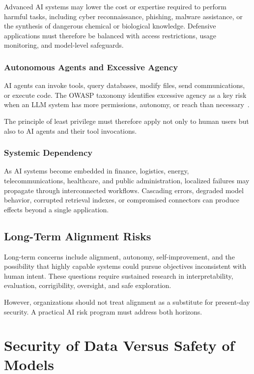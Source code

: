 \documentclass[conference]{IEEEtran}
\begin{document}
Advanced AI systems may lower the cost or expertise required to perform harmful tasks, including cyber reconnaissance, phishing, malware assistance, or the synthesis of dangerous chemical or biological knowledge. Defensive applications must therefore be balanced with access restrictions, usage monitoring, and model-level safeguards.

\subsubsection{Autonomous Agents and Excessive Agency}

AI agents can invoke tools, query databases, modify files, send communications, or execute code. The OWASP taxonomy identifies excessive agency as a key risk when an LLM system has more permissions, autonomy, or reach than necessary~\cite{owasp_llm_top10}.

The principle of least privilege must therefore apply not only to human users but also to AI agents and their tool invocations.

\subsubsection{Systemic Dependency}

As AI systems become embedded in finance, logistics, energy, telecommunications, healthcare, and public administration, localized failures may propagate through interconnected workflows. Cascading errors, degraded model behavior, corrupted retrieval indexes, or compromised connectors can produce effects beyond a single application.

\subsection{Long-Term Alignment Risks}

Long-term concerns include alignment, autonomy, self-improvement, and the possibility that highly capable systems could pursue objectives inconsistent with human intent. These questions require sustained research in interpretability, evaluation, corrigibility, oversight, and safe exploration.

However, organizations should not treat alignment as a substitute for present-day security. A practical AI risk program must address both horizons.

\section{Security of Data Versus Safety of Models}
\end{document}
